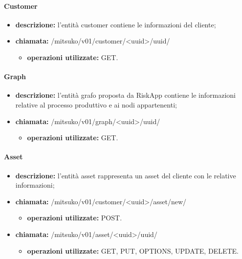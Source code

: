 \paragraph{Customer}
\begin{itemize}
	\item \textbf{descrizione:} l'entità customer contiene le informazioni del cliente;
	\item \textbf{chiamata:} /mitsuko/v01/customer/<uuid>/uuid/
	\begin{itemize}\item \textbf{operazioni utilizzate:} GET.\end{itemize}
\end{itemize}

\paragraph{Graph}
\begin{itemize}
	\item \textbf{descrizione:} l'entità grafo proposta da RiskApp contiene le informazioni relative al processo produttivo e ai nodi appartenenti;
	\item \textbf{chiamata:} /mitsuko/v01/graph/<uuid>/uuid/
	\begin{itemize}\item \textbf{operazioni utilizzate:} GET.\end{itemize}
\end{itemize}

\paragraph{Asset}
\begin{itemize}
\item \textbf{descrizione:} l'entità asset rappresenta un asset del cliente con le relative informazioni;
\item \textbf{chiamata:} /mitsuko/v01/customer/<uuid>/asset/new/
\begin{itemize}\item \textbf{operazioni utilizzate:} POST.\end{itemize}
\item \textbf{chiamata:} /mitsuko/v01/asset/<uuid>/uuid/
\begin{itemize}\item \textbf{operazioni utilizzate:} GET, PUT, OPTIONS, UPDATE, DELETE.\end{itemize}
\end{itemize}

